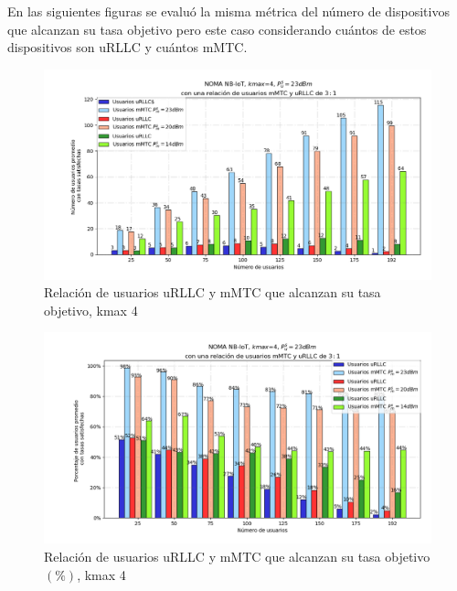 \break

En las siguientes figuras se evaluó la misma métrica del número de dispositivos que alcanzan su tasa objetivo pero este caso considerando cuántos de estos dispositivos son uRLLC y cuántos mMTC.\newline

\begin{figure}[th]
    \centering
    \includegraphics[scale=.65]{Figures/ResultadosNOMA/Kmax4_DiferentesPM.png}
    \decoRule
    \caption[Relación de usuarios uRLLC y mMTC que alcanzan su tasa objetivo, kmax 4]{Relación de usuarios uRLLC y mMTC que alcanzan su tasa objetivo, kmax 4}
    \label{fig:Kmax4_DiferentesPM}
\end{figure}

\begin{figure}[th]
    \centering
    \includegraphics[scale=.65]{Figures/ResultadosNOMA/Kmax4_DiferentesPM_Porcentual.png}
    \decoRule
    \caption[Relación de usuarios uRLLC y mMTC que alcanzan su tasa objetivo $(\%)$, kmax 4]{Relación de usuarios uRLLC y mMTC que alcanzan su tasa objetivo$(\%)$, kmax 4}
    \label{fig:Kmax4_DiferentesPM_Porcentual}
\end{figure}


